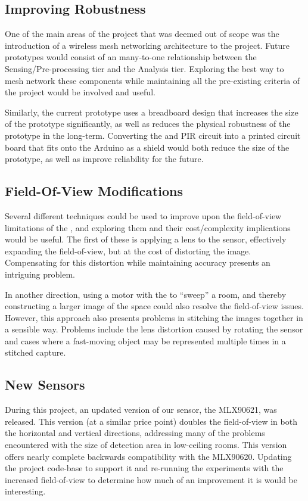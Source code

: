 \documentclass[../thesis/thesis.tex]{subfiles}
\begin{document}
\subsection{Improving Robustness}
One of the main areas of the project that was deemed out of scope was the introduction of a wireless mesh networking architecture to the project. Future prototypes would consist of an many-to-one relationship between the Sensing/Pre-processing tier and the Analysis tier. Exploring the best way to mesh network these components while maintaining all the pre-existing criteria of the project would be involved and useful.

Similarly, the current prototype uses a breadboard design that increases the size of the prototype significantly, as well as reduces the physical robustness of the prototype in the long-term. Converting the \mlx and PIR circuit into a printed circuit board that fits onto the Arduino as a shield would both reduce the size of the prototype, as well as improve reliability for the future.

\subsection{Field-Of-View Modifications}
Several different techniques could be used to improve upon the field-of-view limitations of the \mlx, and exploring them and their cost/complexity implications would be useful. The first of these is applying a lens to the sensor, effectively expanding the field-of-view, but at the cost of distorting the image. Compensating for this distortion while maintaining accuracy presents an intriguing problem.

In another direction, using a motor with the \mlx to ``sweep'' a room, and thereby constructing a larger image of the space could also resolve the field-of-view issues. However, this approach also presents problems in stitching the images together in a sensible way. Problems include the lens distortion caused by rotating the sensor and cases where a fast-moving object may be represented multiple times in a stitched capture.

\subsection{New Sensors}
During this project, an updated version of our sensor, the MLX90621, was released. This version (at a similar price point) doubles the field-of-view in both the horizontal and vertical directions, addressing many of the problems encountered with the size of detection area in low-ceiling rooms. This version offers nearly complete backwards compatibility with the MLX90620. Updating the project code-base to support it and re-running the experiments with the increased field-of-view to determine how much of an improvement it is would be interesting.
\end{document}
